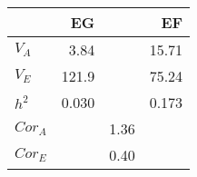 \documentclass[10pt]{standalone}
\begin{document}
\begin{tabular}{l r r r} 
\toprule
 		& EG		&		& EF  		\\
\midrule
$V_A$  		& 3.84		& 		& 15.71		\\[5pt]
$V_E$		& 121.9	  	& 		& 75.24		\\[5pt]	
$h^2$		& 0.030		&		& 0.173		\\[5pt]
$Cor_A$			&		& 1.36		&		\\[5pt]
$Cor_E$			&		& 0.40		&		\\[5pt]

\bottomrule
\end{tabular}
\end{document}
